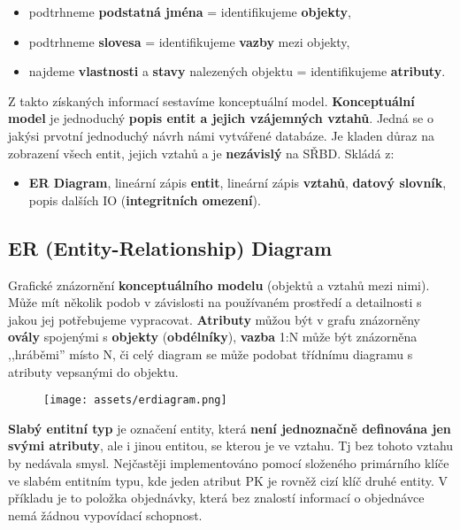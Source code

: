\begin{itemize}
    \item podtrhneme \textbf{podstatná jména} = identifikujeme \textbf{objekty},
    \item podtrhneme \textbf{slovesa} = identifikujeme \textbf{vazby} mezi objekty,
    \item najdeme \textbf{vlastnosti} a \textbf{stavy} nalezených objektu = identifikujeme \textbf{atributy}.
\end{itemize}

Z takto získaných informací sestavíme konceptuální model. \textbf{Konceptuální model} je jednoduchý \textbf{popis entit a jejich vzájemných vztahů}. Jedná se o jakýsi prvotní jednoduchý návrh námi vytvářené databáze. Je kladen důraz na zobrazení všech entit, jejich vztahů a je \textbf{nezávislý} na SŘBD. Skládá z:
\begin{itemize}
    \item \textbf{ER Diagram}, lineární zápis \textbf{entit}, lineární zápis \textbf{vztahů}, \textbf{datový slovník}, popis dalších IO (\textbf{integritních omezení}).
\end{itemize}

\subsection{ER (Entity-Relationship) Diagram}
Grafické znázornění \textbf{konceptuálního modelu} (objektů a vztahů mezi nimi). Může mít několik podob v závislosti na používaném prostředí a detailnosti s jakou jej potřebujeme vypracovat. \textbf{Atributy} můžou být v grafu znázorněny \textbf{ovály} spojenými s \textbf{objekty} (\textbf{obdélníky}), \textbf{vazba} 1:N může být znázorněna ,,hráběmi'' místo N, či celý diagram se může podobat třídnímu diagramu s atributy vepsanými do objektu.

\begin{figure}[H]
    \centering
    \texttt{[image: assets/erdiagram.png]}
\end{figure}

\textbf{Slabý entitní typ} je označení entity, která \textbf{není jednoznačně definována jen svými atributy}, ale i jinou entitou, se kterou je ve vztahu. Tj bez tohoto vztahu by nedávala smysl. Nejčastěji implementováno pomocí složeného primárního klíče ve slabém entitním typu, kde jeden atribut PK je rovněž cizí klíč druhé entity. V příkladu je to položka objednávky, která bez znalostí informací o objednávce nemá žádnou vypovídací schopnost.

